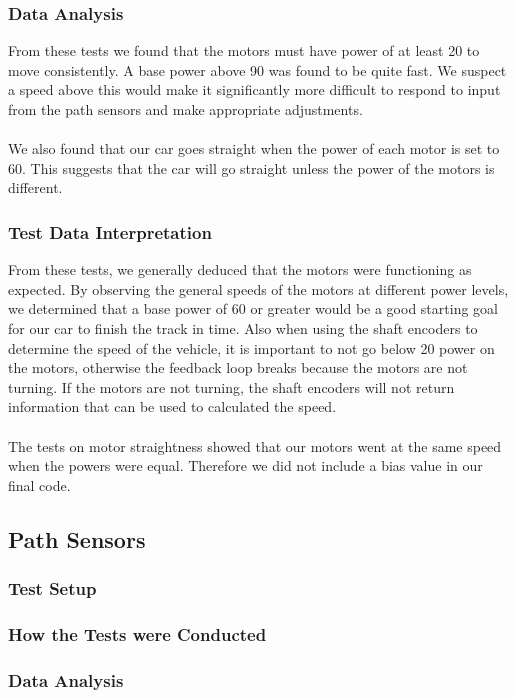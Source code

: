 \documentclass[12pt]{article}
\begin{document}
\subsubsection{Data Analysis}
From these tests we found that the motors must have power of at least 20 to move consistently. A base power above 90 was found to be quite fast. We suspect a speed above this would make it significantly more difficult to respond to input from the path sensors and make appropriate adjustments.
\\ \\ 
We also found that our car goes straight when the power of each motor is set to 60. This suggests that the car will go straight unless the power of the motors is different.

\subsubsection{Test Data Interpretation}
From these tests, we generally deduced that the motors were functioning as expected. By observing the general speeds of the motors at different power levels, we determined that a base power of 60 or greater would be a good starting goal for our car to finish the track in time. Also when using the shaft encoders to determine the speed of the vehicle, it is important to not go below 20 power on the motors, otherwise the feedback loop breaks because the motors are not turning. If the motors are not turning, the shaft encoders will not return information that can be used to calculated the speed.
\\ \\ 
The tests on motor straightness showed that our motors went at the same speed when the powers were equal. Therefore we did not include a bias value in our final code.

\subsection{Path Sensors}
\subsubsection{Test Setup}

\subsubsection{How the Tests were Conducted}

\subsubsection{Data Analysis}
\end{document}
